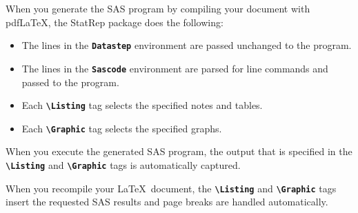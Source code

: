 \documentclass{article}
\newcommand*{\Statrep}{\mbox{\textsf{StatRep}}\xspace}
\newcommand*{\Code}[1]{\texttt{\textbf{#1}}}
\newcommand*{\cs}[1]{\texttt{\textbf{\textbackslash#1}}}
\begin{document}
When you generate 
the SAS program by compiling your document with pdf\LaTeX, 
the \Statrep package does the following:
\begin{itemize}
\item The lines in the \Code{Datastep} environment are passed unchanged to the program.
\item The lines in the \Code{Sascode} environment are parsed for line commands and passed
to the program.
\item Each \cs{Listing} tag  selects the specified notes and tables. 

\item Each \cs{Graphic} tag selects the specified graphs.

\end{itemize}

When you execute the generated SAS program, the output that is
specified in the \cs{Listing} and \cs{Graphic}
tags is automatically captured. 
 
When you recompile your \LaTeX\ document, the \cs{Listing} and \cs{Graphic} tags 
insert the requested SAS results and page breaks are handled automatically.
\end{document}
